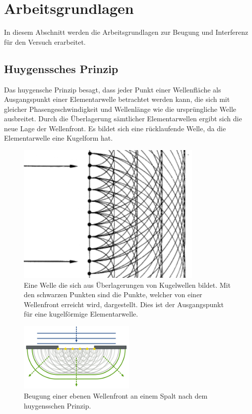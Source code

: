 \section{Arbeitsgrundlagen}
In diesem Abschnitt werden die Arbeitsgrundlagen zur Beugung und Interferenz für den Versuch erarbeitet.
\subsection{Huygenssches Prinzip}
Das huygensche Prinzip besagt, dass jeder Punkt einer Wellenfläche als Ausgangspunkt einer Elementarwelle betrachtet werden kann, die sich mit gleicher Phasengeschwindigkeit und Wellenlänge wie die ursprüngliche Welle ausbreitet. Durch die Überlagerung sämtlicher Elementarwellen ergibt sich die neue Lage der Wellenfront. Es bildet sich eine rücklaufende Welle, da die Elementarwelle eine Kugelform hat.

\begin{figure}[h!]
	\centering
	\includegraphics[width=0.8\textwidth]{data/huygens}
	\caption{Eine Welle die sich aus Überlagerungen von Kugelwellen bildet. Mit den schwarzen Punkten sind die Punkte, welcher von einer Wellenfront erreicht wird, dargestellt. Dies ist der Ausgangspunkt für eine kugelförmige Elementarwelle. }
	\label{fig:heygens}
\end{figure}

\newpage
\begin{figure}[h!]
	\centering
	\includegraphics[width=0.5\textwidth]{data/hspalt.png}
	\caption{Beugung einer ebenen Wellenfront an einem Spalt nach dem huygensschen Prinzip.}
	\label{fig:heygens_spalt}
\end{figure}

